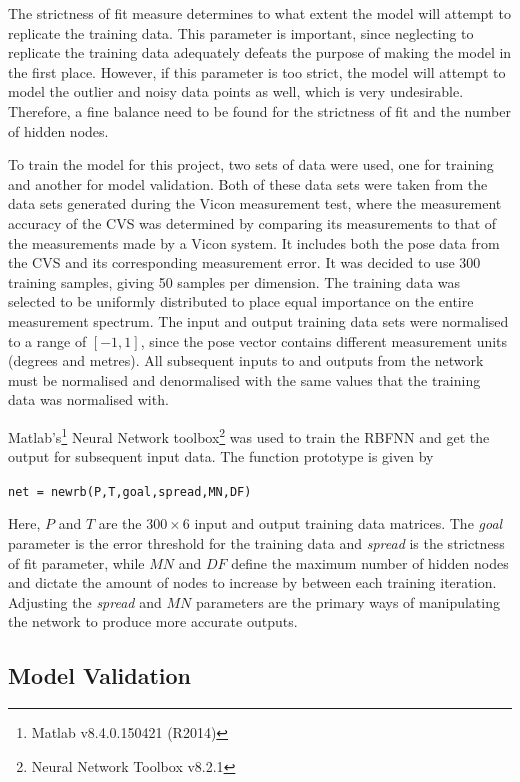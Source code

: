 The strictness of fit measure determines to what extent the model will attempt to replicate the training data. This parameter is important, since neglecting to replicate the training data adequately defeats the purpose of making the model in the first place. However, if this parameter is too strict, the model will attempt to model the outlier and noisy data points as well, which is very undesirable. Therefore, a fine balance need to be found for the strictness of fit and the number of hidden nodes. 

To train the model for this project, two sets of data were used, one for training and another for model validation. Both of these data sets were taken from the data sets generated during the Vicon measurement test, where the measurement accuracy of the CVS was determined by comparing its measurements to that of the measurements made by a Vicon system. It includes both the pose data from the CVS and its corresponding measurement error. It was decided to use 300 training samples, giving 50 samples per dimension. The training data was selected to be uniformly distributed to place equal importance on the entire measurement spectrum. The input and output training data sets were normalised to a range of $[-1, 1]$, since the pose vector contains different measurement units (degrees and metres). All subsequent inputs to and outputs from the network must be normalised and denormalised with the same values that the training data was normalised with.  

Matlab's\footnote{Matlab v8.4.0.150421 (R2014)} Neural Network toolbox\footnote{Neural Network Toolbox v8.2.1} was used to train the RBFNN and get the output for subsequent input data. The function prototype is given by 

\begin{center}
  \verb|net = newrb(P,T,goal,spread,MN,DF)|
\end{center}

Here, $P$ and $T$ are the $300\times6$ input and output training data matrices. The \emph{goal} parameter is the error threshold for the training data and \emph{spread} is the strictness of fit parameter, while $\mathit{MN}$ and $\mathit{DF}$ define the maximum number of hidden nodes and dictate the amount of nodes to increase by between each training iteration. Adjusting the \emph{spread} and $\mathit{MN}$ parameters are the primary ways of manipulating the network to produce more accurate outputs. 

\subsection{Model Validation}

